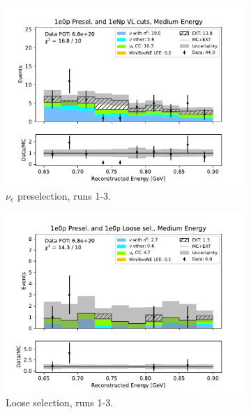 \begin{figure}[H]
    \centering
    \begin{subfigure}{0.33\linewidth}
        \includegraphics[width=\linewidth]{technote/Sidebands/Figures/NearSideband/near_sideband_reco_e_run123_ZP_ZP_MEDIUM_ENERGY.pdf}
        \caption{$\nu_e$ preselection, runs 1-3.}
    \end{subfigure}%
    \begin{subfigure}{0.33\linewidth}
        \includegraphics[width=\linewidth]{technote/Sidebands/Figures/NearSideband/near_sideband_reco_e_run123_ZP_ZPLOOSESEL_MEDIUM_ENERGY.pdf}
        \caption{Loose selection, runs 1-3.}
    \end{subfigure}%
    \begin{subfigure}{0.33\linewidth}

\end{subfigure}
\end{figure}
